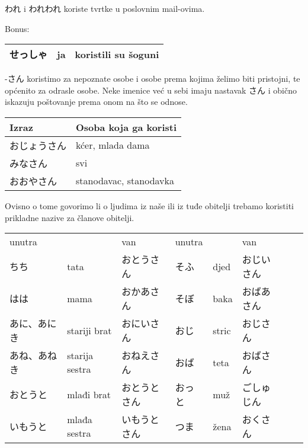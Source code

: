
	\newpage
	
	われ i われわれ koriste tvrtke u poslovnim mail-ovima.\newline
	
	
	Bonus:
	\begin{tabular}{l l l}
		\toprule[2pt]
		せっしゃ&ja&koristili su šoguni\\
		\bottomrule[2pt]
	\end{tabular}
	

	\ten {}

	-さん	koristimo za nepoznate osobe i osobe prema kojima želimo biti pristojni, te općenito za odrasle osobe. Neke imenice već u sebi imaju nastavak さん i obično iskazuju poštovanje prema onom na što se odnose.
	
	\begin{table}[!h]	
	\begin{tabular}{l l}
		\toprule[2pt]
		Izraz&Osoba koja ga koristi\\
		\midrule
		おじょうさん&kćer, mlada dama\\
		みなさん&svi\\
		おおやさん&stanodavac, stanodavka\\
		\bottomrule[2pt]
	\end{tabular}
	\end{table}

	Ovisno o tome govorimo li o ljudima iz naše ili iz tuđe obitelji trebamo koristiti prikladne nazive za članove obitelji. 
	
	\begin{table}[!h]
	\begin{tabular}{l l l l l l l l}
		\toprule[2pt]
		unutra& &van&unutra& &van\\
		ちち&tata&おとうさん&そふ&djed&おじいさん\\
		はは&mama&おかあさん&そぼ&baka&おばあさん\\
		あに、あにき&stariji brat&おにいさん&おじ&stric&おじさん\\
		あね、あねき&starija sestra&おねえさん&おば&teta&おばさん\\
		おとうと&mlađi brat&おとうとさん&おっと&muž&ごしゅじん\\
		いもうと&mlađa sestra&いもうとさん&つま&žena&おくさん\\
		\bottomrule[2pt]
	\end{tabular}
	\end{table}
	
